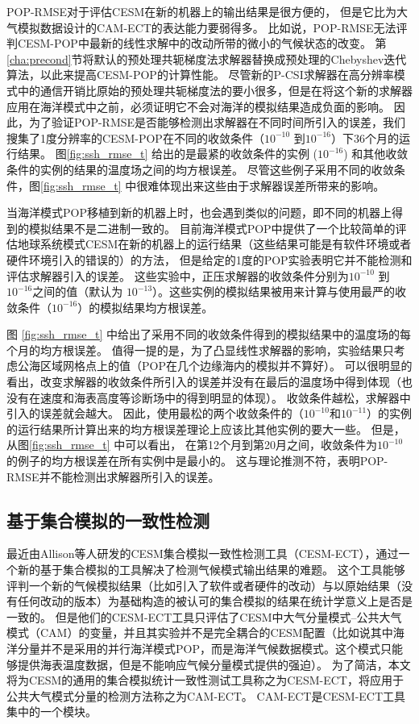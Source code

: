 POP-RMSE对于评估CESM在新的机器上的输出结果是很方便的， 但是它比为大气模拟数据设计的CAM-ECT的表达能力要弱得多。 
比如说，POP-RMSE无法评判CESM-POP中最新的线性求解中的改动所带的微小的气候状态的改变\cite{yong2015}。 
第\ref{cha:precond}节将默认的预处理共轭梯度法求解器替换成预处理的Chebyshev迭代算法，以此来提高CESM-POP的计算性能。
尽管新的P-CSI求解器在高分辨率模式中的通信开销比原始的预处理共轭梯度法的要小很多，但是在将这个新的求解器应用在海洋模式中之前，必须证明它不会对海洋的模拟结果造成负面的影响。 
因此，为了验证POP-RMSE是否能够检测出求解器在不同时间所引入的误差，我们搜集了1度分辨率的CESM-POP在不同的收敛条件（$10^{-10}$ 到$10^{-16}$）下36个月的运行结果。
图\ref{fig:ssh_rmse_t} 给出的是最紧的收敛条件的实例 ($10^{-16}$) 和其他收敛条件的实例的结果的温度场之间的均方根误差。 
尽管这些例子采用不同的收敛条件，图\ref{fig:ssh_rmse_t} 中很难体现出来这些由于求解器误差所带来的影响\cite{yong2015}。 



当海洋模式POP移植到新的机器上时，也会遇到类似的问题，即不同的机器上得到的模拟结果不是二进制一致的。 
目前海洋模式POP中提供了一个比较简单的评估地球系统模式CESM在新的机器上的运行结果（这些结果可能是有软件环境或者硬件环境引入的错误的）的方法， 但是给定的1度的POP实验表明它并不能检测和评估求解器引入的误差。 
这些实验中，正压求解器的收敛条件分别为$10^{-10}$ 到$10^{-16}$之间的值（默认为 $10^{-13}$）。这些实例的模拟结果被用来计算与使用最严的收敛条件（$10^{-16}$）的模拟结果均方根误差。 

图 \ref{fig:ssh_rmse_t} 中给出了采用不同的收敛条件得到的模拟结果中的温度场的每个月的均方根误差。 
值得一提的是，为了凸显线性求解器的影响，实验结果只考虑公海区域网格点上的值（POP在几个边缘海内的模拟并不算好）。 
可以很明显的看出，改变求解器的收敛条件所引入的误差并没有在最后的温度场中得到体现（也没有在速度和海表高度等诊断场中的得到明显的体现）。 
收敛条件越松，求解器中引入的误差就会越大。
因此，使用最松的两个收敛条件的（$10^{-10}$和$10^{-11}$）的实例的运行结果所计算出来的均方根误差理论上应该比其他实例的要大一些。 
但是，从图\ref{fig:ssh_rmse_t} 中可以看出， 
在第12个月到第20月之间，收敛条件为$10^{-10}$的例子的均方根误差在所有实例中是最小的。 
这与理论推测不符，表明POP-RMSE并不能检测出求解器所引入的误差。

\subsection{基于集合模拟的一致性检测}
\label{verify:enseble}

最近由Allison等人\cite{baker2015}研发的CESM集合模拟一致性检测工具（CESM-ECT），通过一个新的基于集合模拟的工具解决了检测气候模式输出结果的难题。 
这个工具能够评判一个新的气候模拟结果（比如引入了软件或者硬件的改动）与以原始结果（没有任何改动的版本）为基础构造的被认可的集合模拟的结果在统计学意义上是否是一致的。 
但是他们的CESM-ECT工具只评估了CESM中大气分量模式--公共大气模式（CAM）的变量，并且其实验并不是完全耦合的CESM配置（比如说其中海洋分量并不是采用的并行海洋模式POP，而是海洋气候数据模式。这个模式只能够提供海表温度数据，但是不能响应气候分量模式提供的强迫）。 
为了简洁，本文将为CESM的通用的集合模拟统计一致性测试工具称之为CESM-ECT，将应用于公共大气模式分量的检测方法称之为CAM-ECT。
CAM-ECT是CESM-ECT工具集中的一个模块。 

